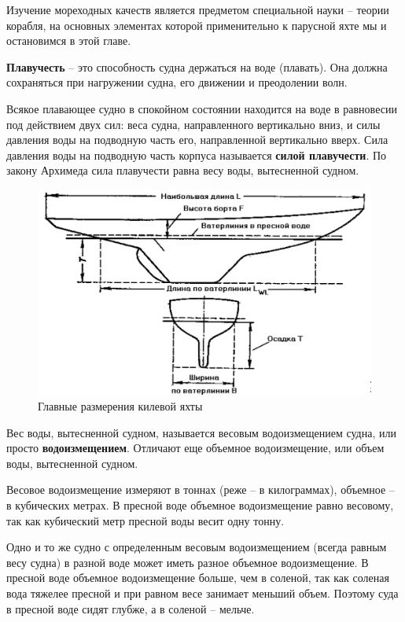 \documentclass[a4paper, 12pt, twoside, final]{scrbook}
\begin{document}
Изучение мореходных качеств является предметом специальной науки \--- теории корабля, на основных элементах которой применительно к парусной яхте мы и остановимся в этой главе.

\textbf{Плавучесть} \--- это способность судна держаться на воде (плавать). Она должна сохраняться при нагружении судна, его движении и преодолении волн.

Всякое плавающее судно в спокойном состоянии находится на воде в равновесии под действием двух сил: веса судна, направленного вертикально вниз, и силы давления воды на подводную часть его, направленной вертикально вверх. Сила давления воды на подводную часть корпуса называется \textbf{силой плавучести}. По закону Архимеда сила плавучести равна весу воды, вытесненной судном.

\begin{figure}[htbp]
   \centering
   \includegraphics{76_Glavnye_razmereniz} %
   \caption{Главные размерения килевой яхты}
   \label{fig:76}
\end{figure}

Вес воды, вытесненной судном, называется весовым водоизмещением судна, или просто \textbf{водоизмещением}. Отличают еще объемное водоизмещение, или объем воды, вытесненной судном.

Весовое водоизмещение измеряют в тоннах (реже \--- в килограммах), объемное \--- в кубических метрах. В пресной воде объемное водоизмещение равно весовому, так как кубический метр пресной воды весит одну тонну.

Одно и то же судно с определенным весовым водоизмещением (всегда равным весу судна) в разной воде может иметь разное объемное водоизмещение. В пресной воде объемное водоизмещение больше, чем в соленой, так как соленая вода тяжелее пресной и при равном весе занимает меньший объем. Поэтому суда в пресной воде сидят глубже, а в соленой \--- мельче.
\end{document}
